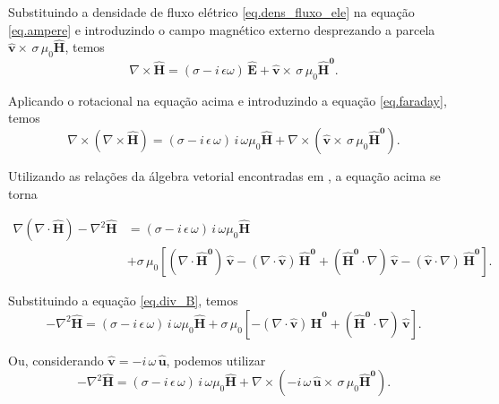 Substituindo a densidade de fluxo el\'etrico \ref{eq.dens_fluxo_ele} na equa\c{c}\~ao \ref{eq.ampere} e introduzindo o campo magn\'etico externo desprezando a parcela $\mathbf{\widehat{v}}\times\,\sigma\,\mu_0\mathbf{\widehat{H}}$, temos
\begin{equation*}
\nabla\times\mathbf{\widehat{H}}=(\sigma-i\,\epsilon\omega)\,\mathbf{\widehat{E}}+\mathbf{\widehat{v}}\times\,\sigma\,\mu_0\mathbf{\widehat{H}^0}.
\end{equation*}

Aplicando o rotacional na equa\c{c}\~ao acima e introduzindo a equa\c{c}\~ao \ref{eq.faraday}, temos
\begin{equation*}
\nabla\times(\nabla\times\mathbf{\widehat{H}})=(\sigma-i\,\epsilon\,\omega)\,i\,\omega\mu_0\mathbf{\widehat{H}}+\nabla\times(\mathbf{\widehat{v}}\times\,\sigma\,\mu_0\mathbf{\widehat{H}^0}).
\end{equation*}

Utilizando as rela\c{c}\~oes da \'algebra vetorial encontradas em \cite{jackson_classical_1999}, a equa\c{c}\~ao acima se torna

\begin{align*}
\nabla(\nabla\cdot\mathbf{\widehat{H}})-\nabla^2\mathbf{\widehat{H}}&=(\sigma-i\,\epsilon\,\omega)\,i\,\omega\mu_0\mathbf{\widehat{H}}\\
&+\sigma\,\mu_0\left[(\nabla\cdot\mathbf{\widehat{H}^0})\,\mathbf{\widehat{v}}-(\nabla\cdot\mathbf{\widehat{v}})\,\mathbf{\widehat{H}^0}+(\mathbf{\widehat{H}^0}\cdot\nabla)\,\mathbf{\widehat{v}}-(\mathbf{\widehat{v}}\cdot\nabla)\,\mathbf{\widehat{H}^0}\right].
\end{align*}

Substituindo a equa\c{c}\~ao \ref{eq.div_B}, temos
\begin{equation*}
-\nabla^2\mathbf{\widehat{H}}=(\sigma-i\,\epsilon\,\omega)\,i\,\omega\mu_0\mathbf{\widehat{H}}+\sigma\,\mu_0\left[-(\nabla\cdot\mathbf{\widehat{v}})\,\mathbf{\widehat{H}^0}+(\mathbf{\widehat{H}^0}\cdot\nabla)\,\mathbf{\widehat{v}}\right].
\end{equation*}

Ou, considerando $\mathbf{\widehat{v}}=-i\,\omega\,\mathbf{\widehat{u}}$, podemos utilizar
\begin{equation}\label{eq.disp_1}
-\nabla^2\mathbf{\widehat{H}}=(\sigma-i\,\epsilon\,\omega)\,i\,\omega\mu_0\mathbf{\widehat{H}}+\nabla\times(-i\,\omega\,\mathbf{\widehat{u}}\times\,\sigma\,\mu_0\mathbf{\widehat{H}^0}).
\end{equation}


